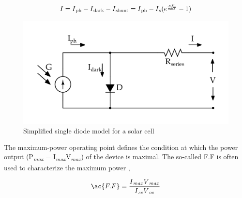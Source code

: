     \begin{equation}
    \begin{aligned}
     I = I\textsubscript{ph} - I\textsubscript{dark} - I\textsubscript{shunt} = I\textsubscript{ph} -  I\textsubscript{s} (e^{\frac{eV}{\textit{mk}T}}-1)
      \label{eq:equ_new_cell_current}
      \end{aligned}
      \end{equation}
  
     
 \begin{figure}[H]
   \begin{center}
   \includegraphics[width=\textwidth]{images/simplified_single_diode_model_simple}
   \caption{ Simplified single diode model for a solar cell }
   \label{fig:simple_EQu_cell}
   \end{center}
   \end{figure}

The maximum-power operating point defines the condition at which the power output (P\textsubscript{\textit{max}} = I\textsubscript{\textit{max}}V\textsubscript{\textit{max}}) of the device is maximal.
The so-called \ac{F.F} is often used to characterize the maximum power ,

\begin{equation}
 \begin{aligned}
  \ac{F.F} = \dfrac{I\textsubscript{\textit{max}}V\textsubscript{\textit{max}}}{I\textsubscript{\textit{sc}}V\textsubscript{\textit{oc}}}
   \label{eq:equ_current_new}
   \end{aligned}
   \end{equation}



